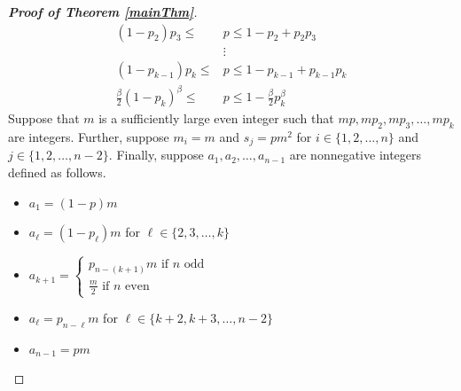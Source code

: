\documentclass[11pt]{article}
\theoremstyle{definition}
\begin{document}
\begin{proof}[\bf{Proof of Theorem \ref{mainThm}}]
\begin{align*}
        (1-p_2)p_3 \leq &p \leq 1-p_2+p_2p_3 \\
        &\vdots \\
        (1-p_{k-1})p_{k} \leq &p \leq 1-p_{k-1}+p_{k-1}p_{k} \\
        \frac{\beta}{2}(1-p_k)^\beta \leq &p \leq 1-\frac{\beta}{2}p_k^\beta
    \end{align*}
    Suppose that $m$ is a sufficiently large even integer such that $mp,mp_2,mp_3,\dots,mp_k$ are integers. Further, suppose $m_i = m$ and $s_j = pm^2$ for $i \in \{1,2,\dots,n \}$ and $j \in \{1,2,\dots,n-2 \}$. Finally, suppose $a_1,a_2,\dots,a_{n-1}$ are nonnegative integers defined as follows.
    \begin{itemize}
        \item $a_1 = (1-p)m$
        \item $a_\ell = (1-p_\ell)m$ for $\ell \in \{2,3,\dots,k \}$
        \item $a_{k+1} = \begin{cases} p_{n-(k+1)}m \text{ if } n \text{ odd} \\ \frac{m}{2} \text{ if } n \text{ even} \end{cases}$
        \item $a_\ell = p_{n-\ell}m$ for $\ell \in \{k+2,k+3,\dots,n-2 \}$
        \item $a_{n-1} = pm$
    \end{itemize}
    

\end{proof}
\end{document}
